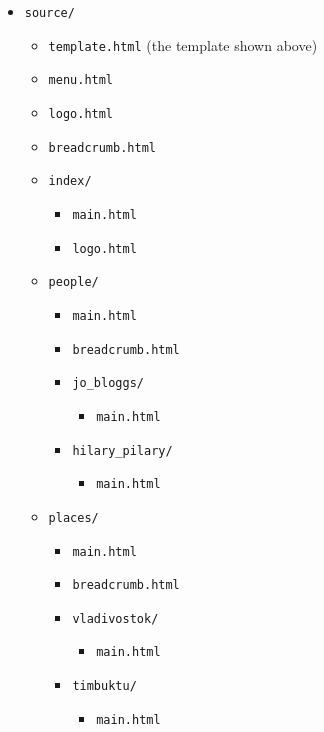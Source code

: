 \documentclass[english]{scrartcl}
\begin{document}
\begin{itemize}
\item \texttt{source/}
  \begin{itemize}
  \item \texttt{template.html} (the template shown above)
  \item \texttt{menu.html}
  \item \texttt{logo.html}
  \item \texttt{breadcrumb.html}
  \item \texttt{index/}
    \begin{itemize}
    \item \texttt{main.html}
    \item \texttt{logo.html}
    \end{itemize}
  \item \texttt{people/}
    \begin{itemize}
    \item \texttt{main.html}
    \item \texttt{breadcrumb.html}
    \item \texttt{jo\_bloggs/}
      \begin{itemize}
      \item \texttt{main.html}
      \end{itemize}
    \item \texttt{hilary\_pilary/}
      \begin{itemize}
      \item \texttt{main.html}
      \end{itemize}
    \end{itemize}
  \item \texttt{places/}
    \begin{itemize}
    \item \texttt{main.html}
    \item \texttt{breadcrumb.html}
    \item \texttt{vladivostok/}
      \begin{itemize}
      \item \texttt{main.html}
      \end{itemize}
    \item \texttt{timbuktu/}
      \begin{itemize}
      \item \texttt{main.html}
      \end{itemize}
    \end{itemize}
  \end{itemize}
\end{itemize}
\end{document}
